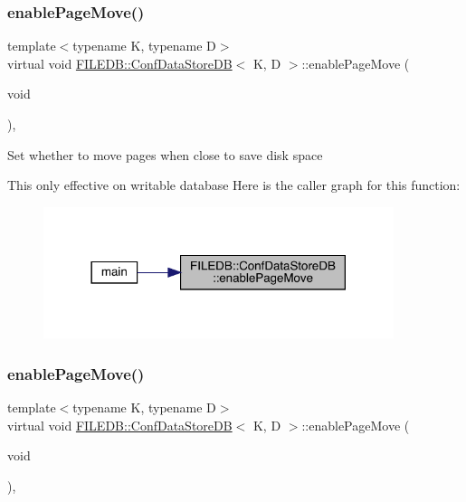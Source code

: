 \subsubsection{\texorpdfstring{enablePageMove()}{enablePageMove()}\hspace{0.1cm}{\footnotesize\ttfamily [1/3]}}
{\footnotesize\ttfamily template$<$typename K, typename D$>$ \\
virtual void \mbox{\hyperlink{classFILEDB_1_1ConfDataStoreDB}{F\+I\+L\+E\+D\+B\+::\+Conf\+Data\+Store\+DB}}$<$ K, D $>$\+::enable\+Page\+Move (\begin{DoxyParamCaption}\item[{void}]{ }\end{DoxyParamCaption})\hspace{0.3cm}{\ttfamily [inline]}, {\ttfamily [virtual]}}

Set whether to move pages when close to save disk space

This only effective on writable database Here is the caller graph for this function\+:
\nopagebreak
\begin{figure}[H]
\begin{center}
\leavevmode
\includegraphics[width=290pt]{d8/d19/classFILEDB_1_1ConfDataStoreDB_ae8f437f44366624ac0d5aba306a5ba42_icgraph}
\end{center}
\end{figure}
\mbox{\label{classFILEDB_1_1ConfDataStoreDB_ae8f437f44366624ac0d5aba306a5ba42}} 
\subsubsection{\texorpdfstring{enablePageMove()}{enablePageMove()}\hspace{0.1cm}{\footnotesize\ttfamily [2/3]}}
{\footnotesize\ttfamily template$<$typename K, typename D$>$ \\
virtual void \mbox{\hyperlink{classFILEDB_1_1ConfDataStoreDB}{F\+I\+L\+E\+D\+B\+::\+Conf\+Data\+Store\+DB}}$<$ K, D $>$\+::enable\+Page\+Move (\begin{DoxyParamCaption}\item[{void}]{ }\end{DoxyParamCaption})\hspace{0.3cm}{\ttfamily [inline]}, {\ttfamily [virtual]}}

